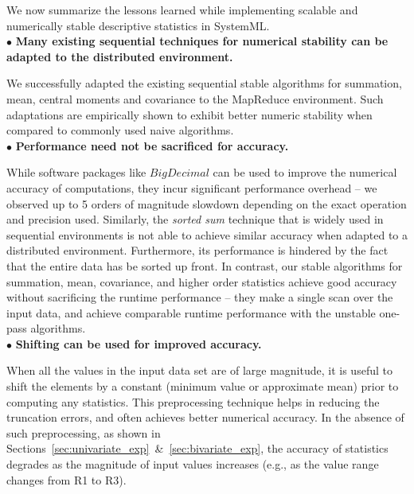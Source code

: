 We now summarize the lessons learned while implementing scalable and numerically stable descriptive statistics in SystemML.
\\

\noindent $\bullet$ \textbf{Many existing sequential techniques for numerical stability can be adapted to the distributed environment.} 

We successfully adapted the existing sequential stable algorithms for summation, mean, central moments and covariance to the MapReduce environment. Such adaptations are empirically shown to exhibit better numeric stability when compared to commonly used naive algorithms.
\\

\noindent $\bullet$ \textbf{Performance need not be sacrificed for accuracy.} 

While software packages like $BigDecimal$ can be used to improve the numerical accuracy of computations, they incur significant performance overhead -- we observed up to 5 orders of magnitude slowdown depending on the exact operation and precision used. Similarly, the {\em sorted sum} technique that is widely used in sequential environments is not able to achieve similar accuracy when adapted to a distributed environment. Furthermore, its performance is hindered by the fact that the entire data has be sorted up front. In contrast, our stable algorithms for summation, mean, covariance, and higher order statistics achieve good accuracy without sacrificing the runtime performance -- they make a single scan over the input data, and achieve comparable runtime performance with the unstable one-pass algorithms.
\\


\noindent $\bullet$ \textbf{Shifting can be used for improved accuracy.} 

When all the values in the input data set are of large magnitude, it is useful to shift the elements by a constant (minimum value or approximate mean) prior to computing any statistics. This preprocessing technique helps in reducing the truncation errors, and often achieves better numerical accuracy. In the absence of such preprocessing, as shown in Sections~\ref{sec:univariate_exp}~\&~\ref{sec:bivariate_exp}, the accuracy of statistics degrades as the magnitude of input values increases (e.g., as the value range changes from R1 to R3).
\\

